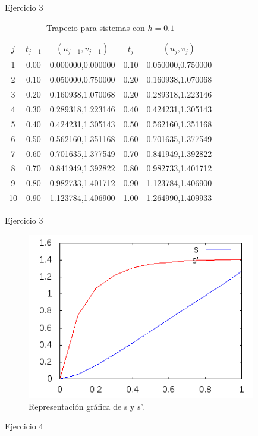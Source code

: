 		\begin{frame}{Ejercicio 3}
			\begin{table}[H]
				\centering
				\begin{tabular}{|| c | c | c | c | c ||}
					\hline
					\hline $j$ &  $t_{j-1}$ & $(u_{j-1},v_{j-1})$ & $t_j$ & $(u_{j},v_{j})$ \\
					\hline 1 & 0.00 & 0.000000,0.000000 & 0.10 & 0.050000,0.750000 \\
					\hline 2 & 0.10 & 0.050000,0.750000 & 0.20 & 0.160938,1.070068 \\
					\hline 3 & 0.20 & 0.160938,1.070068 & 0.20 & 0.289318,1.223146 \\
					\hline 4 & 0.30 & 0.289318,1.223146 & 0.40 & 0.424231,1.305143 \\
					\hline 5 & 0.40 & 0.424231,1.305143 & 0.50 & 0.562160,1.351168 \\
					\hline 6 & 0.50 & 0.562160,1.351168 & 0.60 & 0.701635,1.377549 \\
					\hline 7 & 0.60 & 0.701635,1.377549 & 0.70 & 0.841949,1.392822 \\
					\hline 8 & 0.70 & 0.841949,1.392822 & 0.80 & 0.982733,1.401712 \\
					\hline 9 & 0.80 & 0.982733,1.401712 & 0.90 & 1.123784,1.406900 \\
					\hline 10 & 0.90 & 1.123784,1.406900 & 1.00 & 1.264990,1.409933 \\
					\hline
					\hline					
				\end{tabular}
				\caption{Trapecio para sistemas con $h=0.1$}
			\end{table}	
		\end{frame}
		
		\begin{frame}{Ejercicio 3}
			\begin{figure}[h]
				\centering
				\includegraphics[width=10cm]{./Images/ejemplo3-1.png}
				\caption{Representación gráfica de s y s'.}
			\end{figure}	
		\end{frame}										
													
		\begin{frame}{Ejercicio 4}
											
		\end{frame}										